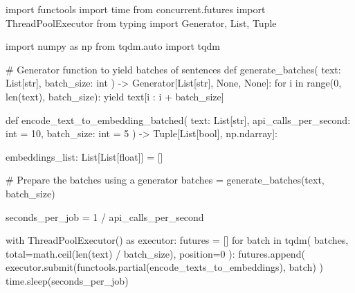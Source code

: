 \documentclass[
  letterpaper,
  DIV=11,
  numbers=noendperiod]{scrreprt}
\newenvironment{Shaded}{\begin{snugshade}}{\end{snugshade}}
\newcommand{\BuiltInTok}[1]{\textcolor[rgb]{0.00,0.23,0.31}{#1}}
\newcommand{\CommentTok}[1]{\textcolor[rgb]{0.37,0.37,0.37}{#1}}
\newcommand{\ControlFlowTok}[1]{\textcolor[rgb]{0.00,0.23,0.31}{#1}}
\newcommand{\DecValTok}[1]{\textcolor[rgb]{0.68,0.00,0.00}{#1}}
\newcommand{\ImportTok}[1]{\textcolor[rgb]{0.00,0.46,0.62}{#1}}
\newcommand{\KeywordTok}[1]{\textcolor[rgb]{0.00,0.23,0.31}{#1}}
\newcommand{\NormalTok}[1]{\textcolor[rgb]{0.00,0.23,0.31}{#1}}
\newcommand{\OperatorTok}[1]{\textcolor[rgb]{0.37,0.37,0.37}{#1}}
\newcommand{\VariableTok}[1]{\textcolor[rgb]{0.07,0.07,0.07}{#1}}
\begin{document}
\begin{Shaded}
\begin{Highlighting}[]
\ImportTok{import}\NormalTok{ functools}
\ImportTok{import}\NormalTok{ time}
\ImportTok{from}\NormalTok{ concurrent.futures }\ImportTok{import}\NormalTok{ ThreadPoolExecutor}
\ImportTok{from}\NormalTok{ typing }\ImportTok{import}\NormalTok{ Generator, List, Tuple}

\ImportTok{import}\NormalTok{ numpy }\ImportTok{as}\NormalTok{ np}
\ImportTok{from}\NormalTok{ tqdm.auto }\ImportTok{import}\NormalTok{ tqdm}


\CommentTok{\# Generator function to yield batches of sentences}
\KeywordTok{def}\NormalTok{ generate\_batches(}
\NormalTok{    text: List[}\BuiltInTok{str}\NormalTok{], batch\_size: }\BuiltInTok{int}
\NormalTok{) }\OperatorTok{{-}\textgreater{}}\NormalTok{ Generator[List[}\BuiltInTok{str}\NormalTok{], }\VariableTok{None}\NormalTok{, }\VariableTok{None}\NormalTok{]:}
    \ControlFlowTok{for}\NormalTok{ i }\KeywordTok{in} \BuiltInTok{range}\NormalTok{(}\DecValTok{0}\NormalTok{, }\BuiltInTok{len}\NormalTok{(text), batch\_size):}
        \ControlFlowTok{yield}\NormalTok{ text[i : i }\OperatorTok{+}\NormalTok{ batch\_size]}


\KeywordTok{def}\NormalTok{ encode\_text\_to\_embedding\_batched(}
\NormalTok{    text: List[}\BuiltInTok{str}\NormalTok{], api\_calls\_per\_second: }\BuiltInTok{int} \OperatorTok{=} \DecValTok{10}\NormalTok{, batch\_size: }\BuiltInTok{int} \OperatorTok{=} \DecValTok{5}
\NormalTok{) }\OperatorTok{{-}\textgreater{}}\NormalTok{ Tuple[List[}\BuiltInTok{bool}\NormalTok{], np.ndarray]:}

\NormalTok{    embeddings\_list: List[List[}\BuiltInTok{float}\NormalTok{]] }\OperatorTok{=}\NormalTok{ []}

    \CommentTok{\# Prepare the batches using a generator}
\NormalTok{    batches }\OperatorTok{=}\NormalTok{ generate\_batches(text, batch\_size)}

\NormalTok{    seconds\_per\_job }\OperatorTok{=} \DecValTok{1} \OperatorTok{/}\NormalTok{ api\_calls\_per\_second}

    \ControlFlowTok{with}\NormalTok{ ThreadPoolExecutor() }\ImportTok{as}\NormalTok{ executor:}
\NormalTok{        futures }\OperatorTok{=}\NormalTok{ []}
        \ControlFlowTok{for}\NormalTok{ batch }\KeywordTok{in}\NormalTok{ tqdm(}
\NormalTok{            batches, total}\OperatorTok{=}\NormalTok{math.ceil(}\BuiltInTok{len}\NormalTok{(text) }\OperatorTok{/}\NormalTok{ batch\_size), position}\OperatorTok{=}\DecValTok{0}
\NormalTok{        ):}
\NormalTok{            futures.append(}
\NormalTok{                executor.submit(functools.partial(encode\_texts\_to\_embeddings), batch)}
\NormalTok{            )}
\NormalTok{            time.sleep(seconds\_per\_job)}


\end{Highlighting}
\end{Shaded}
\end{document}
